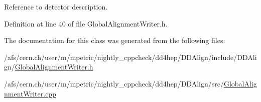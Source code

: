 Reference to detector description. 

Definition at line 40 of file GlobalAlignmentWriter.h.

The documentation for this class was generated from the following files:\begin{DoxyCompactItemize}
\item 
/afs/cern.ch/user/m/mpetric/nightly\_\-cppcheck/dd4hep/DDAlign/include/DDAlign/\hyperlink{_global_alignment_writer_8h}{GlobalAlignmentWriter.h}\item 
/afs/cern.ch/user/m/mpetric/nightly\_\-cppcheck/dd4hep/DDAlign/src/\hyperlink{_global_alignment_writer_8cpp}{GlobalAlignmentWriter.cpp}\end{DoxyCompactItemize}
